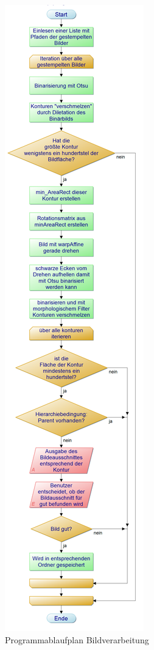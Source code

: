 \documentclass[12pt,toc=bib,toc=listof]{scrreprt}
\begin{document}
\begin{figure}[h]
\begin{minipage}[t]{.33\linewidth}
  \includegraphics[width=\linewidth]{./bilder/BV_pap}
  \caption{Programmablaufplan Bildverarbeitung}
  \label{fig:bv_pap}
\end{minipage}
\end{figure}
\end{document}
